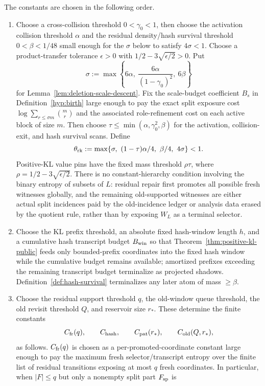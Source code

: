 \documentclass[11pt]{article}
\begin{document}
The constants are chosen in the following order.
\begin{enumerate}[label=\textup{(\arabic*)}]
\item Choose a cross-collision threshold $0<\gamma_0<1$, then choose the
activation collision threshold $\alpha$ and the residual density/hash survival
threshold $0<\beta<1/48$ small enough for the $\sigma$ below to satisfy
$4\sigma<1$.  Choose a product-transfer tolerance
$\epsilon>0$ with $1/2-3\sqrt{\epsilon/2}>0$.  Put
\[
  \sigma
  :=
  \max\left\{6\alpha,\ \frac{6\alpha}{(1-\gamma_0)^2},\ 6\beta\right\}
\]
for Lemma~\ref{lem:deletion-scale-descent}.  Fix the scale-budget coefficient
$B_s$ in
Definition~\ref{hyp:birth} large enough to pay the exact split exposure cost
$\log\sum_{r\le\sigma m}\binom mr$ and the associated role-refinement cost on
each active block of size $m$.  Then choose
$\tau\le\min(\alpha,\gamma_0^2,\beta)$ for the activation, collision-exit, and
hash survival scans.  Define
\[
  \theta_{\rm rk}:=\max\{\sigma,\ (1-\tau)\alpha/4,\ \beta/4,\ 4\sigma\}<1.
\]
Positive-KL value pins have the fixed mass threshold
$\rho\tau$, where $\rho=1/2-3\sqrt{\epsilon/2}$.  There is no
constant-hierarchy condition
involving the binary entropy of subsets of $L$: residual repair first promotes
all possible fresh witnesses globally, and the remaining old-supported
witnesses are either actual split incidences paid by the old-incidence ledger
or analysis data erased by the quotient rule, rather than by exposing $W_L$ as
a terminal selector.
\item Choose the KL prefix threshold, an absolute fixed hash-window length
$h$, and a cumulative hash transcript budget $B_{\rm win}$ so that
Theorem~\ref{thm:positive-kl-public} feeds only bounded-prefix coordinates
into the fixed hash window while the cumulative budget remains available;
amortized prefixes exceeding the remaining transcript budget terminalize as
projected shadows.  Definition~\ref{def:hash-survival} terminalizes any later
atom of mass $\ge\beta$.
\item Choose the residual support threshold $q$, the old-window queue
threshold, the old revisit threshold $Q$, and reservoir size $r_*$.  These
determine the finite constants
\[
  C_{\rm fr}(q),\qquad C_{\rm hash},\qquad
  C_{\rm pat}(r_*),\qquad C_{\rm old}(Q,r_*),
\]
as follows.  $C_{\rm fr}(q)$ is chosen as a per-promoted-coordinate constant
large enough to pay the maximum fresh selector/transcript entropy over the
finite list of residual transitions exposing at most $q$ fresh coordinates.  In
particular, when $|F|\le q$ but only a nonempty split part $F_{\rm sp}$ is

\end{enumerate}
\end{document}
